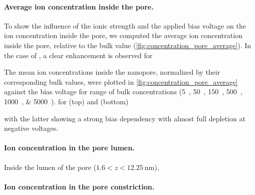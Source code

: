 \documentclass[journal=ancac3, manuscript=article, etalmode=truncate,maxauthors=0]{achemso}
\begin{document}
\paragraph{Average ion concentration inside the pore.}
To show the influence of the ionic strength and the applied bias voltage on the ion concentration inside the pore,
we computed the average ion concentration inside the pore, relative to the bulk value (\cref{fig:concentration_pore_average}).
In the case of , a clear enhancement is observed for 

The mean ion concentrations inside the nanopore, normalized by their corresponding bulk values, were plotted in \cref{fig:concentration_pore_average} against the bias voltage for range of bulk concentrations (\SIlist{5;50;150;500;1000;5000}{\mM}).
for  (top) and  (bottom)





with the latter showing a strong bias dependency 
with almost full depletion at negative voltages.
\paragraph{Ion concentration in the pore lumen.}
Inside the lumen of the pore ($1.6<z<\SI{12.25}{\nm}$), 
\paragraph{Ion concentration in the pore constriction.}




%
\end{document}
